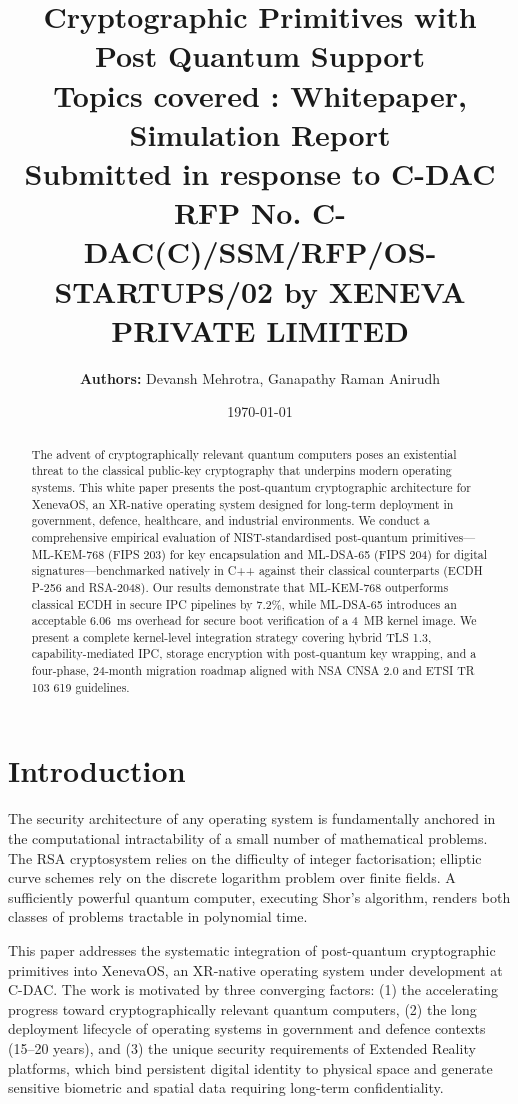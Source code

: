 \documentclass[11pt, a4paper]{article}
\title{\Large\textbf{Cryptographic Primitives with Post Quantum Support}\\[0.5em]
\large Topics covered : Whitepaper, Simulation Report\\[1em]
\normalsize Submitted in response to C-DAC RFP No. C-DAC(C)/SSM/RFP/OS-STARTUPS/02 by XENEVA PRIVATE LIMITED}
\author{\textbf{Authors:} Devansh Mehrotra, Ganapathy Raman Anirudh}
\date{\today}
\begin{document}
\maketitle

\begin{abstract}
The advent of cryptographically relevant quantum computers poses an existential threat to the classical public-key cryptography that underpins modern operating systems. This white paper presents the post-quantum cryptographic architecture for XenevaOS, an XR-native operating system designed for long-term deployment in government, defence, healthcare, and industrial environments. We conduct a comprehensive empirical evaluation of NIST-standardised post-quantum primitives---ML-KEM-768 (FIPS 203) for key encapsulation and ML-DSA-65 (FIPS 204) for digital signatures---benchmarked natively in C++ against their classical counterparts (ECDH P-256 and RSA-2048). Our results demonstrate that ML-KEM-768 outperforms classical ECDH in secure IPC pipelines by 7.2\%, while ML-DSA-65 introduces an acceptable 6.06~ms overhead for secure boot verification of a 4~MB kernel image. We present a complete kernel-level integration strategy covering hybrid TLS 1.3, capability-mediated IPC, storage encryption with post-quantum key wrapping, and a four-phase, 24-month migration roadmap aligned with NSA CNSA 2.0 and ETSI TR 103 619 guidelines.
\end{abstract}

\newpage
\tableofcontents
\newpage

\section{Introduction}\label{sec:introduction}

The security architecture of any operating system is fundamentally anchored in the computational intractability of a small number of mathematical problems. The RSA cryptosystem relies on the difficulty of integer factorisation; elliptic curve schemes rely on the discrete logarithm problem over finite fields. A sufficiently powerful quantum computer, executing Shor's algorithm, renders both classes of problems tractable in polynomial time.

This paper addresses the systematic integration of post-quantum cryptographic primitives into XenevaOS, an XR-native operating system under development at C-DAC. The work is motivated by three converging factors: (1) the accelerating progress toward cryptographically relevant quantum computers, (2) the long deployment lifecycle of operating systems in government and defence contexts (15--20 years), and (3) the unique security requirements of Extended Reality platforms, which bind persistent digital identity to physical space and generate sensitive biometric and spatial data requiring long-term confidentiality.
\end{document}

